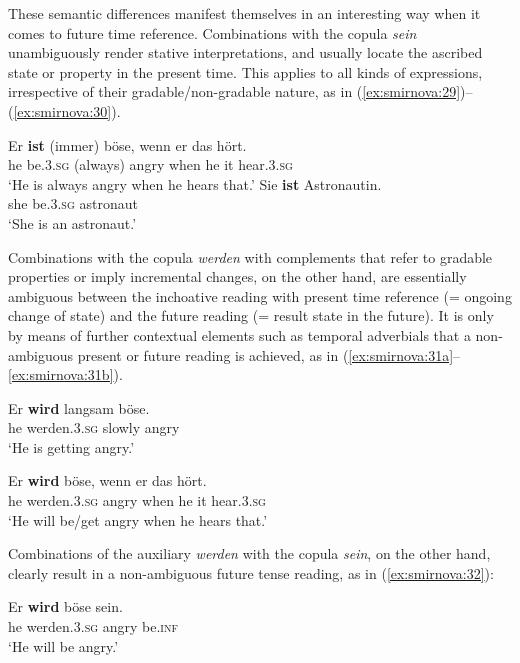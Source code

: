 \documentclass[output=paper,colorlinks,citecolor=brown]{langscibook}
\begin{document}
These semantic differences manifest themselves in an interesting way when it comes to future time reference. Combinations with the copula \textit{sein} unambiguously render stative interpretations, and usually locate the ascribed state or property in the present time. This applies to all kinds of expressions, irrespective of their gradable/non-gradable nature, as in (\ref{ex:smirnova:29})--(\ref{ex:smirnova:30}).

\ea \label{ex:smirnova:29}
\gll Er \textbf{ist} (immer) böse, wenn er das hört.\\
he be.\textsc{3.sg} (always) angry when he it hear.\textsc{3.sg} \\
\glt `He is always angry when he hears that.'
\z
\ea\label{ex:smirnova:30}
\gll Sie \textbf{ist} Astronautin.\\
    she be.\textsc{3.sg} astronaut \\
\glt `She is an astronaut.'
\z

Combinations with the copula \textit{werden} with complements that refer to gradable properties or imply incremental changes, on the other hand, are essentially ambiguous between the inchoative reading with present time reference (= ongoing change of state) and the future reading (= result state in the future). It is only by means of further contextual elements such as temporal adverbials that a non-ambiguous present or future reading is achieved, as in (\ref{ex:smirnova:31a}--\ref{ex:smirnova:31b}).

\ea\label{ex:smirnova:31}
\ea\label{ex:smirnova:31a}
\gll Er \textbf{wird} langsam böse. \\
    he werden.\textsc{3.sg} slowly angry \\
\glt `He is getting angry.'

\ex\label{ex:smirnova:31b}
\gll Er \textbf{wird} böse, wenn er das hört. \\
    he werden.\textsc{3.sg} angry when he it hear.\textsc{3.sg} \\
\glt `He will be/get angry when he hears that.'
\z
\z

Combinations of the auxiliary \textit{werden} with the copula \textit{sein}, on the other hand, clearly result in a non-ambiguous future tense reading, as in (\ref{ex:smirnova:32}):

\ea\label{ex:smirnova:32}
\gll Er \textbf{wird} böse sein. \\
    he werden.\textsc{3.sg} angry be.\textsc{inf}\\
\glt `He will be angry.'
\z
\end{document}
